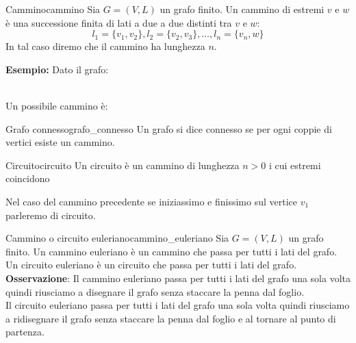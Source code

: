 \documentclass[12pt, letterpaper]{report}
\newcounter{definition}
\newcommand{\nmu}{}
\begin{document}
   	\begin{definition}{\nmu Cammino}{cammino}
   		Sia $G=(V, L)$ un grafo finito. Un cammino di estremi $v$ e $w$ è una successione finita di lati a due a due distinti tra $v$ e $w$:
   		\[
   		l_1 = \{v_1, v_2\}, l_2 = \{v_2,v_3\}, \dots, l_n=\{v_n, w\}
   		\]
   		In tal caso diremo che il cammino ha lunghezza $n$.
   	\end{definition}
   	\textbf{Esempio:} Dato il grafo: \\
   	 \\
   	Un possibile cammino è: \\
   	\begin{definition}{\nmu Grafo connesso}{grafo_connesso}
   		Un grafo si dice connesso se per ogni coppie di vertici esiste un cammino.
   	\end{definition}
   	\begin{definition}{\nmu Circuito}{circuito}
   		Un circuito è un cammino di lunghezza $n > 0$ i cui estremi coincidono
   	\end{definition}
   	Nel caso del cammino precedente se iniziassimo e finissimo sul vertice $v_1$ parleremo di circuito.
   	\begin{definition}{\nmu Cammino o circuito euleriano}{cammino_euleriano}
   		Sia $G=(V, L)$ un grafo finito. Un cammino euleriano è un cammino che passa per tutti i lati del grafo. \\
   		Un circuito euleriano è un circuito che passa per tutti i lati del grafo. \\
   		\textbf{Osservazione}: Il cammino euleriano passa per tutti i lati del grafo una sola volta quindi riusciamo a disegnare il grafo senza staccare la penna dal foglio. \\
   		Il circuito euleriano passa per tutti i lati del grafo una sola volta quindi riusciamo a ridisegnare il grafo senza staccare la penna dal foglio e al tornare al punto di partenza.
   	\end{definition}
\end{document}
